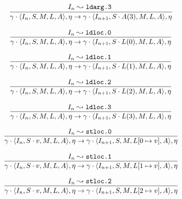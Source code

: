 \documentclass[declaration,shortabstract,english,mgr]{iithesis}
\newcommand{\mstate}[5] {
	\langle#1, #2, #3, #4, #5\rangle
}
\newcommand{\ipointsto}[3] {
	#1 \leadsto \texttt{#2} \text{ } #3
}
\newcommand{\setarrayitem}[3] {
	#1[#2 \mapsto #3]
}
\begin{document}
\begin{equation}
\label{eq:semantics_ldarg3}
	\infer{
		\gamma \cdot \mstate{I_n}{S}{M}{L}{A}, \eta
			\rightarrow
		\gamma \cdot \mstate{I_{n+1}}{S \cdot A(3)}{M}{L}{A}, \eta
	}
	{\ipointsto{I_n}{ldarg.3}}
\end{equation}

\begin{equation}
\label{eq:semantics_ldloc0}
	\infer{
		\gamma \cdot \mstate{I_n}{S}{M}{L}{A}, \eta
			\rightarrow
		\gamma \cdot \mstate{I_{n+1}}{S \cdot L(0)}{M}{L}{A}, \eta
	}
	{\ipointsto{I_n}{ldloc.0}}
\end{equation}

\begin{equation}
\label{eq:semantics_ldloc1}
	\infer{
		\gamma \cdot \mstate{I_n}{S}{M}{L}{A}, \eta
			\rightarrow
		\gamma \cdot \mstate{I_{n+1}}{S \cdot L(1)}{M}{L}{A}, \eta
	}
	{\ipointsto{I_n}{ldloc.1}}
\end{equation}

\begin{equation}
\label{eq:semantics_ldloc2}
	\infer{
		\gamma \cdot \mstate{I_n}{S}{M}{L}{A}, \eta
			\rightarrow
		\gamma \cdot \mstate{I_{n+1}}{S \cdot L(2)}{M}{L}{A}, \eta
	}
	{\ipointsto{I_n}{ldloc.2}}
\end{equation}

\begin{equation}
\label{eq:semantics_ldloc3}
	\infer{
		\gamma \cdot \mstate{I_n}{S}{M}{L}{A}, \eta
			\rightarrow
		\gamma \cdot \mstate{I_{n+1}}{S \cdot L(3)}{M}{L}{A}, \eta
	}
	{\ipointsto{I_n}{ldloc.3}}
\end{equation}

\begin{equation}
\label{eq:semantics_stloc0}
	\infer{
		\gamma \cdot \mstate{I_n}{S \cdot v}{M}{L}{A}, \eta
			\rightarrow
		\gamma \cdot \mstate{I_{n+1}}{S}{M}{\setarrayitem{L}{0}{v}}{A}, \eta
	}
	{\ipointsto{I_n}{stloc.0}}
\end{equation}

\begin{equation}
\label{eq:semantics_stloc1}
	\infer{
		\gamma \cdot \mstate{I_n}{S \cdot v}{M}{L}{A}, \eta
			\rightarrow
		\gamma \cdot \mstate{I_{n+1}}{S}{M}{\setarrayitem{L}{1}{v}}{A}, \eta
	}
	{\ipointsto{I_n}{stloc.1}}
\end{equation}

\begin{equation}
\label{eq:semantics_stloc2}
	\infer{
		\gamma \cdot \mstate{I_n}{S \cdot v}{M}{L}{A}, \eta
			\rightarrow
		\gamma \cdot \mstate{I_{n+1}}{S}{M}{\setarrayitem{L}{2}{v}}{A}, \eta
	}
	{\ipointsto{I_n}{stloc.2}}
\end{equation}
\end{document}
